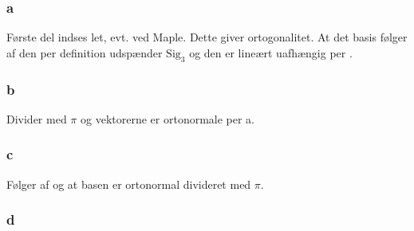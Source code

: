 			\subsubsection{a}

				Første del indses let, evt. ved Maple. Dette giver ortogonalitet. At det basis følger af den per definition udspænder $\text{Sig}_3$ og den er lineært uafhængig per \cite[Definition 4.3.4]{hesselholt2017}.

			\subsubsection{b}

				Divider med $\pi$ og vektorerne er ortonormale per a.

			\subsubsection{c}

				Følger af \cite[Sætning 6.2.6]{hesselholt2017} og at basen er ortonormal divideret med $\pi$.


			\subsubsection{d}

				












	




